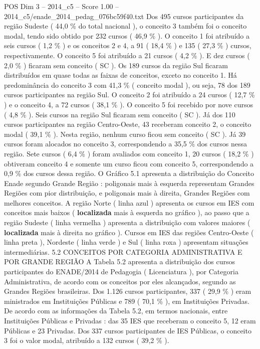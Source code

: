 \begin{textsample}{POS Dim 3 – 2014\_c5 – Score 1.00 – 2014\_c5/enade\_2014\_pedag\_076bc59f40.txt}
Dos 495 cursos participantes da região Sudeste ( 44,0 \% do total nacional ), o conceito 3 também foi o conceito modal, tendo sido obtido por 232 cursos ( 46,9 \% ).
O conceito 1 foi atribuído a seis cursos ( 1,2 \% ) e os conceitos 2 e 4, a 91 ( 18,4 \% ) e 135 ( 27,3 \% ) cursos, respectivamente.
O conceito 5 foi atribuído a 21 cursos ( 4,2 \% ).
E dez cursos ( 2,0 \% ) ficaram sem conceito ( SC ).
Os 189 cursos da região Sul ficaram distribuídos em quase todas as faixas de conceitos, exceto no conceito 1.
Há predominância do conceito 3 com 41,3 \% ( conceito modal ), ou seja, 78 dos 189 cursos participantes na região Sul.
O conceito 2 foi atribuído a 24 cursos ( 12,7 \% ) e o conceito 4, a 72 cursos ( 38,1 \% ).
O conceito 5 foi recebido por nove cursos ( 4,8 \% ).
Seis cursos na região Sul ficaram sem conceito ( SC ).
Já dos 110 cursos participantes na região Centro-Oeste, 43 receberam conceito 2, o conceito modal ( 39,1 \% ).
Nesta região, nenhum curso ficou sem conceito ( SC ).
Já 39 cursos foram alocados no conceito 3, correspondendo a 35,5 \% dos cursos nessa região.
Sete cursos ( 6,4 \% ) foram avaliados com conceito 1, 20 cursos ( 18,2 \% ) obtiveram conceito 4 e somente um curso ficou com conceito 5, correspondendo a 0,9 \% dos cursos dessa região.
O Gráfico 5.1 apresenta a distribuição do Conceito Enade segundo Grande Região : poligonais mais à esquerda representam Grandes Regiões com pior distribuição, e poligonais mais à direita, Grandes Regiões com melhores conceitos.
A região Norte ( linha azul ) apresenta os cursos em IES com conceitos mais baixos ( \textbf{localizada} mais à esquerda no gráfico ), ao passo que a região Sudeste ( linha vermelha ) apresenta a distribuição com valores maiores ( \textbf{localizada} mais à direita no gráfico ).
Cursos em IES das regiões Centro-Oeste ( linha preta ), Nordeste ( linha verde ) e Sul ( linha roxa ) apresentam situações intermediárias. 5.2 CONCEITOS POR CATEGORIA ADMINISTRATIVA E POR GRANDE REGIÃO A Tabela 5.2 apresenta a distribuição dos cursos participantes do ENADE/2014 de Pedagogia ( Licenciatura ), por Categoria Administrativa, de acordo com os conceitos por eles alcançados, segundo as Grandes Regiões brasileiras.
Dos 1.126 cursos participantes, 337 ( 29,9 \% ) eram ministrados em Instituições Públicas e 789 ( 70,1 \% ), em Instituições Privadas.
De acordo com as informações da Tabela 5.2, em termos nacionais, entre Instituições Públicas e Privadas : das 35 IES que receberam o conceito 5, 12 eram Públicas e 23 Privadas.
Dos 337 cursos participantes de IES Públicas, o conceito 3 foi o valor modal, atribuído a 132 cursos ( 39,2 \% ).

\end{textsample}

